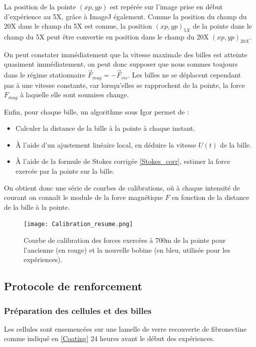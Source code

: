  La position de la pointe $(xp,yp)$ est repérée sur l'image prise en début d'expérience au 5X, grâce à ImageJ également. Comme la position du champ du 20X dans le champ du 5X est connue, la position $(xp,yp)_{5X}$ de la pointe dans le champ du 5X peut être convertie en position dans le champ du 20X $(xp,yp)_{20X}$. 
 
 On peut constater immédiatement que la vitesse maximale des billes est atteinte quasiment immédiatement, on peut donc supposer que nous sommes toujours dans le régime stationnaire $\vec{F}_{mag}=-\vec{F}_{vis}$. 
 Les billes ne se déplacent cependant pas à une vitesse constante, car lorsqu'elles se rapprochent de la pointe, la force $F_{mag}$ à laquelle elle sont soumises change. 
 
 Enfin, pour chaque bille, un algorithme sous Igor permet de : 
 \begin{itemize}
 \item Calculer la distance de la bille à la pointe à chaque instant.
 \item \`A l'aide d'un ajustement linéaire local, en déduire la vitesse $U(t)$ de la bille.
 \item \`A l'aide de la formule de Stokes corrigée \ref{Stokes_corr}, estimer la force exercée par la pointe sur la bille.
 \end{itemize}
 
 On obtient donc une série de courbes de calibrations, où à chaque intensité de courant on connaît le module de la force magnétique $F$ en fonction de la distance de la bille à la pointe. 
 
 \begin{figure}
 \texttt{[image: Calibration\_resume.png]}
 \caption{Courbe de calibration des forces exercées à 700\micro m de la pointe pour l'ancienne (en rouge) et la nouvelle bobine (en bleu, utilisée pour les expériences). }
 \end{figure}
	
	
	\subsection{Protocole de renforcement}
	\subsubsection{Préparation des cellules et des billes}
	
	Les cellules sont ensemencées sur une lamelle de verre recouverte de fibronectine comme indiqué en \ref{Coating} 24 heures avant le début des expériences. 
	
